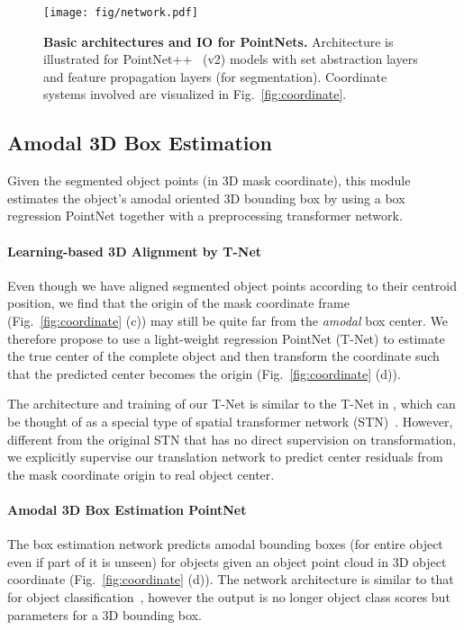 \documentclass[10pt,twocolumn,letterpaper]{article}
\begin{document}
\begin{figure}[t!]
    \centering
    \texttt{[image: fig/network.pdf]}
    \caption{\textbf{Basic architectures and IO for PointNets.} Architecture is illustrated for PointNet++~\cite{qi2017pointnetplusplus} (v2) models with set abstraction layers and feature propagation layers (for segmentation). Coordinate systems involved are visualized in Fig.~\ref{fig:coordinate}.}
    \label{fig:network}
\end{figure}

\subsection{Amodal 3D Box Estimation}
\label{sec:box_estimation}

Given the segmented object points (in 3D mask coordinate), this module estimates the object's amodal oriented 3D bounding box by using a box regression PointNet together with a preprocessing transformer network.

\paragraph{Learning-based 3D Alignment by T-Net} Even though we have aligned segmented object points according to their centroid position, we find that the origin of the mask coordinate frame (Fig.~\ref{fig:coordinate} (c)) may still be quite far from the \emph{amodal} box center. We therefore propose to use a light-weight regression PointNet (T-Net) to estimate the true center of the complete object and then transform the coordinate such that the predicted center becomes the origin (Fig.~\ref{fig:coordinate} (d)).

The architecture and training of our T-Net is similar to the T-Net in \cite{qi2017pointnet}, which can be thought of as a special type of spatial transformer network (STN)~\cite{jaderberg2015spatial}. However, different from the original STN that has no direct supervision on transformation, we explicitly supervise our translation network to predict center residuals from the mask coordinate origin to real object center. 

\paragraph{Amodal 3D Box Estimation PointNet}
The box estimation network predicts amodal bounding boxes (for entire object even if part of it is unseen) for objects given an object point cloud in 3D object coordinate (Fig.~\ref{fig:coordinate} (d)). The network architecture is similar to that for object classification~\cite{qi2017pointnet, qi2017pointnetplusplus}, however the output is no longer object class scores but parameters for a 3D bounding box.
\end{document}

